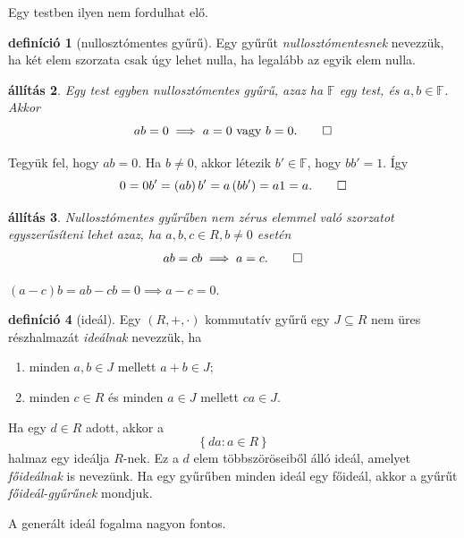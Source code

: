 \documentclass[a4paper, showtrims]{memoir}
\makeatletter
\renewenvironment{proof}[1][\proofname]
    {\par\pushQED{\qed}%
    \normalfont \topsep6\p@\@plus6\p@\relax
    \trivlist
    \item[\hskip\labelsep
        \itshape
    #1\@addpunct{:}]\ignorespaces}
    {\popQED\endtrivlist\@endpefalse}
\theoremstyle{plain}
\newtheorem{proposition}{állítás}[chapter]
\theoremstyle{remark}
\theoremstyle{definition}
\newtheorem{definition}[proposition]{definíció}
\makeatother
\begin{document}
Egy testben ilyen nem fordulhat elő.
\begin{definition}[nullosztómentes gyűrű]
	Egy gyűrűt \emph{nullosztómentesnek} nevezzük,
	ha két elem szorzata csak úgy lehet nulla,
	ha legalább az egyik elem nulla.
\end{definition}
\begin{proposition}
	Egy test egyben nullosztómentes gyűrű, azaz
	ha $\mathbb{F}$ egy test, és $a,b\in\mathbb{F}$.
	Akkor
	\[
		ab=0\implies a=0\text{ vagy }b=0.\qedhere
	\]
\end{proposition}
\begin{proof}
	Tegyük fel, hogy $ab=0$.
	Ha $b\neq 0$, akkor létezik $b'\in\mathbb{F}$, hogy $bb'=1$.
	Így
	\[
		0= 0b'=\left( ab \right)b'=a\left( bb' \right)=a1=a.\qedhere
	\]
\end{proof}
\begin{proposition}
	Nullosztómentes gyűrűben nem zérus elemmel való szorzatot egyszerűsíteni lehet
	azaz, ha $a,b,c\in R,b\neq 0$ esetén
	\[
		ab=cb\implies a=c.\qedhere
	\]
\end{proposition}
\begin{proof}
	\begin{math}
		\left( a-c \right)b=ab-cb=0\implies a-c=0.
	\end{math}
\end{proof}
\begin{definition}[ideál]
	Egy $\left( R,+,\cdot \right)$ kommutatív gyűrű egy $J\subseteq R$ nem üres részhalmazát
	\emph{ideálnak} nevezzük,
	ha
	\begin{enumerate}
		\item
		      minden $a,b\in J$ mellett $a+b\in J$;
		\item
		      minden $c\in R$ és minden $a\in J$ mellett $ca\in J$.
	\end{enumerate}
	Ha egy $d\in R$ adott, akkor a
	\[
		\left\{ da:a\in R \right\}
	\]
	halmaz egy ideálja $R$-nek.
	Ez a $d$ elem többszöröseiből álló ideál, amelyet \emph{főideálnak} is nevezünk.
	Ha egy gyűrűben minden ideál egy főideál, akkor a gyűrűt \emph{főideál-gyűrűnek} mondjuk.
\end{definition}
A generált ideál fogalma nagyon fontos.
\end{document}
